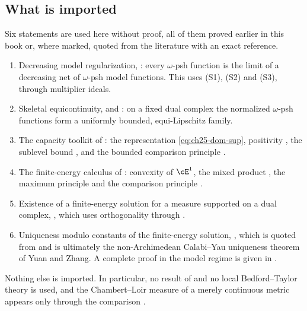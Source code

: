 \subsection{What is imported}
\label{sec:ch29-imported}

Six statements are used here without proof, all of them proved earlier in
this book or, where marked, quoted from the literature with an exact
reference.

\begin{enumerate}
\item\label{itm:ch29-import:reg}
 Decreasing model regularization,
 : every \(\omega\)-psh function is
 the limit of a decreasing net of \(\omega\)-psh model functions.  This uses
 \textup{(S1)}, \textup{(S2)} and \textup{(S3)}, through multiplier ideals.
\item\label{itm:ch29-import:equi}
 Skeletal equicontinuity,  and
 : on a fixed dual complex the normalized
 \(\omega\)-psh functions form a uniformly bounded, equi-Lipschitz family.
\item\label{itm:ch29-import:cap}
 The capacity toolkit of : the representation
 \eqref{eq:ch25-dom-sup}, positivity
 , the sublevel bound
 , and the bounded comparison principle
 .
\item\label{itm:ch29-import:e1}
 The finite-energy calculus of : convexity of
 \(\cE^1\), the mixed product , the maximum
 principle  and the comparison
 principle .
\item\label{itm:ch29-import:var}
 Existence of a finite-energy solution for a measure supported on a dual
 complex, , which uses orthogonality through
 .
\item\label{itm:ch29-import:uniq}
 Uniqueness modulo constants of the finite-energy solution,
 , which is quoted from
 \cite[\S8]{BFJ15} and is ultimately the non-Archimedean Calabi--Yau
 uniqueness theorem of Yuan and Zhang.  A complete proof in the model
 regime is given in .
\end{enumerate}

Nothing else is imported.  In particular, no result of
 and no local Bedford--Taylor theory is used,
and the Chambert--Loir measure of a merely continuous metric appears only
through the comparison .

